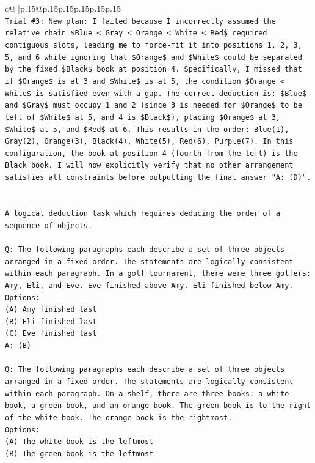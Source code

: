 \documentclass{article}
\begin{document}
{\begin{supertabular}{c@{$\;$}|p{.15\linewidth}@{}p{.15\linewidth}p{.15\linewidth}p{.15\linewidth}p{.15\linewidth}p{.15\linewidth}}
{{{\\ 
\texttt{Trial \#3: New plan: I failed because I incorrectly assumed the relative chain \$Blue < Gray < Orange < White < Red\$ required contiguous slots, leading me to force{-}fit it into positions 1, 2, 3, 5, and 6 while ignoring that \$Orange\$ and \$White\$ could be separated by the fixed \$Black\$ book at position 4. Specifically, I missed that if \$Orange\$ is at 3 and \$White\$ is at 5, the condition \$Orange < White\$ is satisfied even with a gap. The correct deduction is: \$Blue\$ and \$Gray\$ must occupy 1 and 2 (since 3 is needed for \$Orange\$ to be left of \$White\$ at 5, and 4 is \$Black\$), placing \$Orange\$ at 3, \$White\$ at 5, and \$Red\$ at 6. This results in the order: Blue(1), Gray(2), Orange(3), Black(4), White(5), Red(6), Purple(7). In this configuration, the book at position 4 (fourth from the left) is the Black book. I will now explicitly verify that no other arrangement satisfies all constraints before outputting the final answer "A: (D)".} \\
\\ 
\\ 
\texttt{A logical deduction task which requires deducing the order of a sequence of objects.} \\
\\ 
\texttt{Q: The following paragraphs each describe a set of three objects arranged in a fixed order. The statements are logically consistent within each paragraph. In a golf tournament, there were three golfers: Amy, Eli, and Eve. Eve finished above Amy. Eli finished below Amy.} \\
\texttt{Options:} \\
\texttt{(A) Amy finished last} \\
\texttt{(B) Eli finished last} \\
\texttt{(C) Eve finished last} \\
\texttt{A: (B)} \\
\\ 
\texttt{Q: The following paragraphs each describe a set of three objects arranged in a fixed order. The statements are logically consistent within each paragraph. On a shelf, there are three books: a white book, a green book, and an orange book. The green book is to the right of the white book. The orange book is the rightmost.} \\
\texttt{Options:} \\
\texttt{(A) The white book is the leftmost} \\
\texttt{(B) The green book is the leftmost} \\
}}}
\end{supertabular}}
\end{document}
